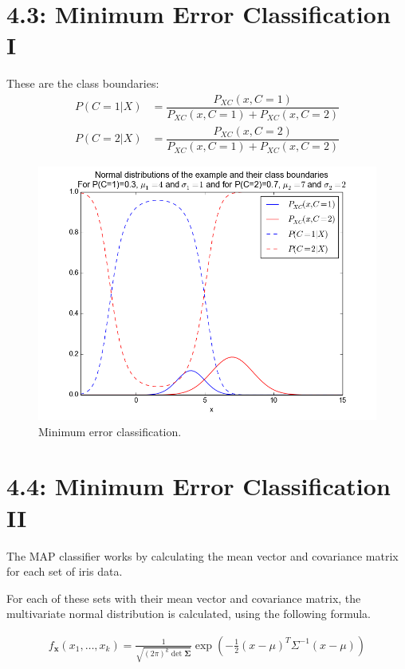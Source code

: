 \documentclass[a4paper,12px]{article}
\begin{document}
\section{4.3: Minimum Error Classification I}
These are the class boundaries:
\begin{equation}
    \begin{aligned}
        P(C=1|X) &= \dfrac{P_{XC}(x,C=1)}{P_{XC}(x,C=1)+ P_{XC}(x,C=2)}\\
        P(C=2|X) &= \dfrac{P_{XC}(x,C=2)}{P_{XC}(x,C=1)+ P_{XC}(x,C=2)}
    \end{aligned}
\end{equation}
\begin{figure}[h!]
    \centering
    \includegraphics[width=1\textwidth]{min_err_class.png}
    \caption{Minimum error classification.}
    \label{fig:knnb_example}
\end{figure}
\FloatBarrier

\section{4.4: Minimum Error Classification II}
The MAP classifier works by calculating the mean vector and covariance matrix for
 each set of iris data.

For each of these sets with their mean vector and covariance matrix, the
multivariate normal distribution is calculated, using the following formula.

\begin{equation}
    \begin{aligned}
        f_{\mathbf x}(x_1,\ldots,x_k) =
        \frac{1}{\sqrt{(2\pi)^{k}\det{\boldsymbol\Sigma}}}
        \exp\left(-\frac{1}{2}(x-\mu)^T\Sigma^{-1}(x-\mu)
    \right)
    \end{aligned}
\end{equation}
\end{document}
